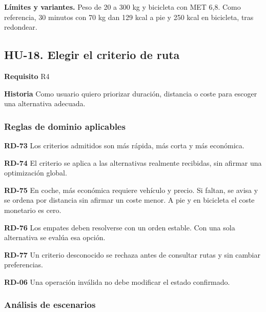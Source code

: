 {\fontsize{9}{11.8}\selectfont\textbf{Límites y variantes.} Peso de 20 a 300 kg y bicicleta con MET 6,8. Como referencia, 30 minutos con 70 kg dan 129 kcal a pie y 250 kcal en bicicleta, tras redondear.\par}\vspace{4pt}
\clearpage\subsection*{HU-18. Elegir el criterio de ruta}

\textbf{Requisito} R4\par

\textbf{Historia} Como usuario quiero priorizar duración, distancia o coste para escoger una alternativa adecuada.\par

\subsubsection*{Reglas de dominio aplicables}

\textbf{RD-73} Los criterios admitidos son más rápida, más corta y más económica.\par

\textbf{RD-74} El criterio se aplica a las alternativas realmente recibidas, sin afirmar una optimización global.\par

\textbf{RD-75} En coche, más económica requiere vehículo y precio. Si faltan, se avisa y se ordena por distancia sin afirmar un coste menor. A pie y en bicicleta el coste monetario es cero.\par

\textbf{RD-76} Los empates deben resolverse con un orden estable. Con una sola alternativa se evalúa esa opción.\par

\textbf{RD-77} Un criterio desconocido se rechaza antes de consultar rutas y sin cambiar preferencias.\par

\textbf{RD-06} Una operación inválida no debe modificar el estado confirmado.\par

\subsubsection*{Análisis de escenarios}

